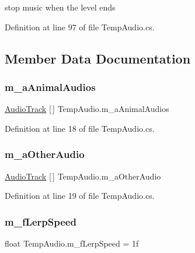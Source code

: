 stop music when the level ends 



Definition at line 97 of file Temp\+Audio.\+cs.



\subsection{Member Data Documentation}
\mbox{\label{class_temp_audio_a81b8a91e44ec86c4a1263fd53e8b7c83}} 
\subsubsection{\texorpdfstring{m\+\_\+a\+Animal\+Audios}{m\_aAnimalAudios}}
{\footnotesize\ttfamily \mbox{\hyperlink{struct_audio_track}{Audio\+Track}} \mbox{[}$\,$\mbox{]} Temp\+Audio.\+m\+\_\+a\+Animal\+Audios}



Definition at line 18 of file Temp\+Audio.\+cs.

\mbox{\label{class_temp_audio_a5bcc844ea3300f7cae93d2692ab2cde9}} 
\subsubsection{\texorpdfstring{m\+\_\+a\+Other\+Audio}{m\_aOtherAudio}}
{\footnotesize\ttfamily \mbox{\hyperlink{struct_audio_track}{Audio\+Track}} \mbox{[}$\,$\mbox{]} Temp\+Audio.\+m\+\_\+a\+Other\+Audio}



Definition at line 19 of file Temp\+Audio.\+cs.

\mbox{\label{class_temp_audio_ac0b9a02bf1193b80dc5a957edd397180}} 
\subsubsection{\texorpdfstring{m\+\_\+f\+Lerp\+Speed}{m\_fLerpSpeed}}
{\footnotesize\ttfamily float Temp\+Audio.\+m\+\_\+f\+Lerp\+Speed = 1f}




